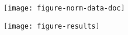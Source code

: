 \documentclass{article}
\begin{document}
\texttt{[image: figure-norm-data-doc]}


\texttt{[image: figure-results]}
\end{document}
